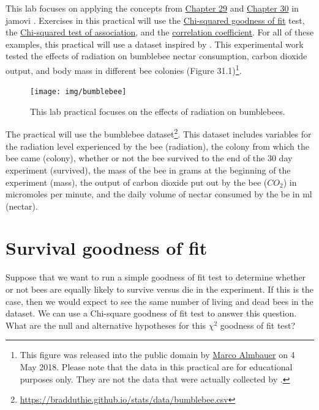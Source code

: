 \documentclass[
]{scrbook}
\begin{document}
This lab focuses on applying the concepts from \protect\hyperlink{Chapter_29}{Chapter 29} and \protect\hyperlink{Chapter_30}{Chapter 30} in jamovi \citep{Jamovi2022}.
Exercises in this practical will use the \protect\hyperlink{chi-squared-goodness-of-fit}{Chi-squared goodness of fit} test, the \protect\hyperlink{chi-squared-test-of-association}{Chi-squared test of association},
and the \protect\hyperlink{correlation-hypothesis-testing}{correlation coefficient}.
For all of these examples, this practical will use a dataset inspired by \citet{Burrows2022}.
This experimental work tested the effects of radiation on bumblebee nectar consumption, carbon dioxide output, and body mass in different bee colonies (Figure 31.1)\footnote{This figure was released into the public domain by \href{https://commons.wikimedia.org/wiki/File:Erdhummel_im_Detail.jpg}{Marco Almbauer} on 4 May 2018. Please note that the data in this practical are for educational purposes only. They are not the data that were actually collected by \citet{Burrows2022}.}.

\begin{figure}
\texttt{[image: img/bumblebee]} \caption{This lab practical focuses on the effects of radiation on bumblebees.}\label{fig:unnamed-chunk-152}
\end{figure}

The practical will use the bumblebee dataset\footnote{\url{https://bradduthie.github.io/stats/data/bumblebee.csv}}.
This dataset includes variables for the radiation level experienced by the bee (radiation), the colony from which the bee came (colony), whether or not the bee survived to the end of the 30 day experiment (survived), the mass of the bee in grams at the beginning of the experiment (mass), the output of carbon dioxide put out by the bee (\(CO_2\)) in micromoles per minute, and the daily volume of nectar consumed by the be in ml (nectar).

\hypertarget{survival-goodness-of-fit}{%
\section{Survival goodness of fit}\label{survival-goodness-of-fit}}

Suppose that we want to run a simple goodness of fit test to determine whether or not bees are equally likely to survive versus die in the experiment.
If this is the case, then we would expect to see the same number of living and dead bees in the dataset.
We can use a Chi-square goodness of fit test to answer this question.
What are the null and alternative hypotheses for this \(\chi^{2}\) goodness of fit test?
\end{document}
